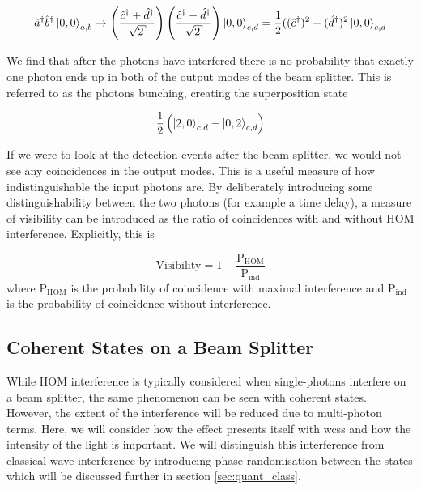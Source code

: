 \begin{equation}
	\hat{a}^\dagger \hat{b}^\dagger \ket{0,0}_{a,b} \rightarrow \left( \frac{\hat{c}^\dagger + \hat{d}^\dagger}{\sqrt{2}} \right)  \left( \frac{\hat{c}^\dagger - \hat{d}^\dagger}{\sqrt{2}} \right)  \ket{0,0}_{c,d} = \frac{1}{2}((\hat{c}^\dagger)^2 - (\hat{d}^\dagger)^2 \ket{0,0}_{c,d}
\end{equation}

We find that after the photons have interfered there is no probability that exactly one photon ends up in both of the output modes of the beam splitter. This is referred to as the photons bunching, creating the superposition state

\begin{equation}
	\frac{1}{2}\left(\ket{2,0}_{c,d} - \ket{0,2}_{c,d}\right)
\end{equation}

If we were to look at the detection events after the beam splitter, we would not see any coincidences in the output modes. This is a useful measure of how indistinguishable the input photons are. By deliberately introducing some distinguishability between the two photons (for example a time delay), a measure of visibility can be introduced as the ratio of coincidences with and without \ac{HOM} interference.  Explicitly, this is

\begin{equation}
	\text{Visibility} = 1 - \frac{\text{P}_\text{HOM}}{\text{P}_\text{ind}}
\end{equation}
where $\text{P}_\text{HOM}$ is the probability of coincidence with maximal interference and $\text{P}_\text{ind}$ is the probability of coincidence without interference.

\subsection{Coherent States on a Beam Splitter}

While \ac{HOM} interference is typically considered when single-photons interfere on a beam splitter, the same phenomenon can be seen with coherent states.  However, the extent of the interference will be reduced due to multi-photon terms. Here, we will consider how the effect presents itself with \acp{wcs} and how the intensity of the light is important. We will distinguish this interference from classical wave interference by introducing phase randomisation between the states which will be discussed further in section \ref{sec:quant_class}.

